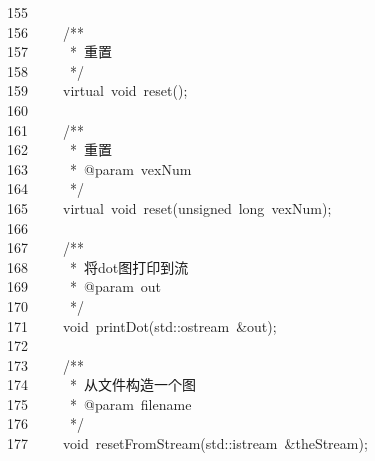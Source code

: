 \documentclass{ctexart}
\newcommand{\hlstd}[1]{\textcolor[rgb]{0.2,0.2,0.2}{#1}}
\newcommand{\hlcom}[1]{\textcolor[rgb]{0.59,0.59,0.59}{#1}}
\newcommand{\hlopt}[1]{\textcolor[rgb]{0.2,0.2,0.2}{#1}}
\newcommand{\hllin}[1]{\textcolor[rgb]{0.59,0.59,0.59}{#1}}
\newcommand{\hlkwb}[1]{\textcolor[rgb]{0.63,0,0.31}{#1}}
\newcommand{\hlkwc}[1]{\textcolor[rgb]{0,0.63,0.31}{#1}}
\newcommand{\hlkwd}[1]{\textcolor[rgb]{0.78,0.23,0.41}{#1}}
\begin{document}
\hllin{155\ }\hlstd{}\\
\hllin{156\ }\hlstd{}\hlstd{\ \ \ \ }\hlstd{}\hlcom{/{*}{*}}\\
\hllin{157\ }\hlcom{}\hlstd{\ \ \ \ \ }\hlcom{{*}\ 重置}\\
\hllin{158\ }\hlcom{}\hlstd{\ \ \ \ \ }\hlcom{{*}/}\hlstd{}\\
\hllin{159\ }\hlstd{}\hlstd{\ \ \ \ }\hlstd{}\hlkwc{virtual\ }\hlstd{}\hlkwb{void\ }\hlstd{}\hlkwd{reset}\hlstd{}\hlopt{();}\\
\hllin{160\ }\hlstd{}\\
\hllin{161\ }\hlstd{}\hlstd{\ \ \ \ }\hlstd{}\hlcom{/{*}{*}}\\
\hllin{162\ }\hlcom{}\hlstd{\ \ \ \ \ }\hlcom{{*}\ 重置}\\
\hllin{163\ }\hlcom{}\hlstd{\ \ \ \ \ }\hlcom{{*}\ @param\ vexNum}\\
\hllin{164\ }\hlcom{}\hlstd{\ \ \ \ \ }\hlcom{{*}/}\hlstd{}\\
\hllin{165\ }\hlstd{}\hlstd{\ \ \ \ }\hlstd{}\hlkwc{virtual\ }\hlstd{}\hlkwb{void\ }\hlstd{}\hlkwd{reset}\hlstd{}\hlopt{(}\hlstd{}\hlkwb{unsigned\ long\ }\hlstd{vexNum}\hlopt{);}\\
\hllin{166\ }\hlstd{}\\
\hllin{167\ }\hlstd{}\hlstd{\ \ \ \ }\hlstd{}\hlcom{/{*}{*}}\\
\hllin{168\ }\hlcom{}\hlstd{\ \ \ \ \ }\hlcom{{*}\ 将dot图打印到流}\\
\hllin{169\ }\hlcom{}\hlstd{\ \ \ \ \ }\hlcom{{*}\ @param\ out}\\
\hllin{170\ }\hlcom{}\hlstd{\ \ \ \ \ }\hlcom{{*}/}\hlstd{}\\
\hllin{171\ }\hlstd{}\hlstd{\ \ \ \ }\hlstd{}\hlkwb{void\ }\hlstd{}\hlkwd{printDot}\hlstd{}\hlopt{(}\hlstd{}\hlkwc{std}\hlstd{}\hlopt{::}\hlstd{ostream\ }\hlopt{\&}\hlstd{out}\hlopt{);}\\
\hllin{172\ }\hlstd{}\\
\hllin{173\ }\hlstd{}\hlstd{\ \ \ \ }\hlstd{}\hlcom{/{*}{*}}\\
\hllin{174\ }\hlcom{}\hlstd{\ \ \ \ \ }\hlcom{{*}\ 从文件构造一个图}\\
\hllin{175\ }\hlcom{}\hlstd{\ \ \ \ \ }\hlcom{{*}\ @param\ filename}\\
\hllin{176\ }\hlcom{}\hlstd{\ \ \ \ \ }\hlcom{{*}/}\hlstd{}\\
\hllin{177\ }\hlstd{}\hlstd{\ \ \ \ }\hlstd{}\hlkwb{void\ }\hlstd{}\hlkwd{resetFromStream}\hlstd{}\hlopt{(}\hlstd{}\hlkwc{std}\hlstd{}\hlopt{::}\hlstd{istream\ }\hlopt{\&}\hlstd{theStream}\hlopt{);}\\
\end{document}
